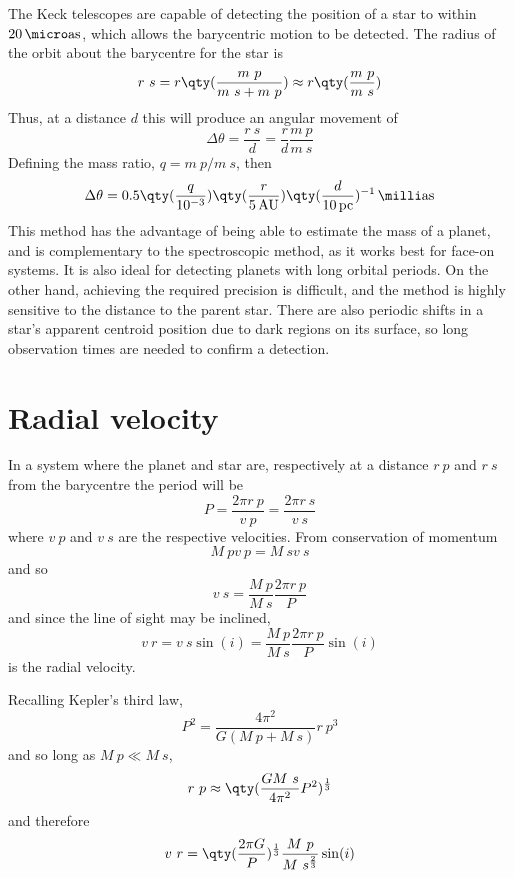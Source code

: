 The Keck telescopes are capable of detecting the position of a star to
within $20\,\micro\text{as}$, which allows the barycentric motion to
be detected. The radius of the orbit about the barycentre for the star is
\begin{equation}
  \label{eq:26}
  r~s = r \qty( \frac{m~p}{m~s + m~p} ) \approx r \qty( \frac{m~p}{m~s})
\end{equation}
Thus, at a distance $d$ this will produce an angular movement of 
\begin{equation}
  \label{eq:27}
  \Delta \theta = \frac{r~s}{d} = \frac{r}{d} \frac{m~p}{m~s}
\end{equation}
Defining the mass ratio, $q = m~p/m~s$, then
\begin{equation}
  \label{eq:28}
  \Delta \theta = 0.5 \qty( \frac{q}{10^{-3}}) \qty( \frac{r}{5\,\text{AU}} ) \qty( \frac{d}{10\,\text{pc}})^{-1} \,\milli\text{as}
\end{equation}
This method has the advantage of being able to estimate the mass of a
planet, and is complementary to the spectroscopic method, as it works
best for face-on systems. It is also ideal for detecting planets with
long orbital periods. On the other hand, achieving the required
precision is difficult, and the method is highly sensitive to the
distance to the parent star. There are also periodic shifts in a
star's apparent centroid position due to dark regions on its surface,
so long observation times are needed to confirm a detection.

\section{Radial velocity}
\label{sec:radial-velocity}

In a system where the planet and star are, respectively at a distance
$r~p$ and $r~s$ from the barycentre the period will be
\[ P = \frac{2 \pi r~p}{v~p} = \frac{2 \pi r~s}{v~s} \] where $v~p$
and $v~s$ are the respective velocities. From conservation of momentum 
\[ M~p v~p = M~s v~s \] and so
\[ v~s = \frac{M~p}{M~s} \frac{2 \pi r~p}{P} \]
and since the line of sight may be inclined,
\[ v~r = v~s \sin(i) = \frac{M~p}{M~s} \frac{2 \pi r~p}{P} \sin(i) \]
is the radial velocity.

Recalling Kepler's third law,
\[ P^2 = \frac{4 \pi^2}{G(M~p + M~s)} r~p^3 \]
and so long as $M~p \ll M~s$,
\[ r~p \approx \qty( \frac{G M~s}{4 \pi^2} P^2 )^{\frac{1}{3}} \]
and therefore
\begin{equation}
  \label{eq:12}
  v~r = \qty( \frac{2 \pi G}{P})^{\frac{1}{3}} \frac{M~p}{M~s^{\frac{2}{3}}} \sin(i)
\end{equation}

